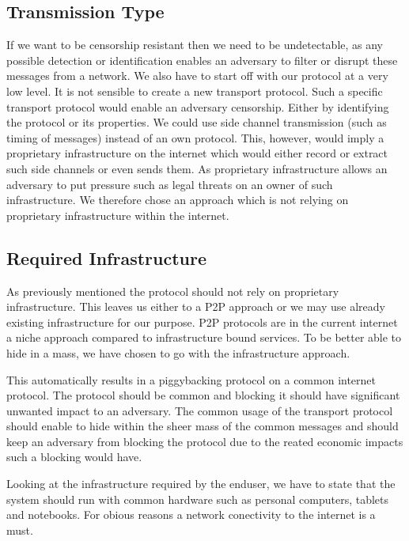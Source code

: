 \subsection{Transmission Type}
If we want to be censorship resistant then we need to be undetectable, as any possible detection or identification enables an adversary to filter or disrupt these messages from a network. We also have to start off with our protocol at a very low level. It is not sensible to create a new transport protocol. Such a specific transport protocol would enable an adversary censorship. Either by identifying the protocol or its properties. We could use side channel transmission (such as timing of messages) instead of an own protocol. This, however, would imply a proprietary infrastructure on the internet which would either record or extract such side channels or even sends them. As proprietary infrastructure allows an adversary to put pressure such as legal threats on an owner of such infrastructure. We therefore chose an approach which is not relying on proprietary infrastructure within the internet.

\subsection{Required Infrastructure}
As previously mentioned the protocol should not rely on proprietary infrastructure. This leaves us either to a P2P approach or we may use already existing infrastructure for our purpose. P2P protocols are in the current internet a niche approach compared to infrastructure bound services. To be better able to hide in a mass, we have chosen to go with the infrastructure approach.

This automatically results in a piggybacking protocol on a common internet protocol. The protocol should be common and blocking it should have significant unwanted impact to an adversary. The common usage of the transport protocol should enable to hide within the sheer mass of the common messages and should keep an adversary from blocking the protocol due to the reated economic impacts such a blocking would have.

Looking at the infrastructure required by the enduser, we have to state that the system should run with common hardware such as personal computers, tablets and notebooks. For obious reasons a network conectivity to the internet is a must.

